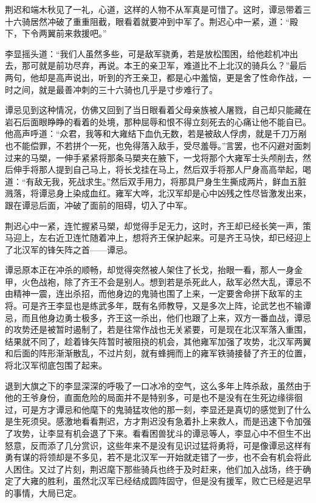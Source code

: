荆迟和端木秋见了一礼，心道，这样的人物不从军真是可惜了。这时，谭忌带着三十六骑居然冲破了重重阻截，眼看着就要冲到中军了。荆迟心中一紧，道：“殿下，下令两翼前来救援吧。”

李显摇头道：“我们人虽然多些，可是敌军骁勇，若是放松围困，给他趁机冲出去，那可就是前功尽弃，再说。本王的亲卫军，难道比不上北汉的骑兵么？”最后两句，他却是高声说出，听到的齐王亲卫，都是心中羞恼，更是舍了性命作战，一时之间，就是最善冲刺的三十六骑也几乎是寸步难行了。

谭忌见到这种情况，仿佛又回到了当日眼看着父母亲族被人屠戮，自己却只能藏在岩石后面眼睁睁的看着的处境，那种屈辱和恨不得立刻死去的心痛让他不能自已。他高声呼道：“众君，我等和大雍结下血仇无数，若是被敌人俘虏，就是千刀万剐也不能偿罪，不若拼个一死，也免得落入敌手，受尽羞辱。”言罢，也不闪避对面刺过来的马槊，一伸手紧紧将那条马槊夹在腋下，一戈将那个大雍军士头颅削去，然后伸手将那人提到自己马上，将长戈挂在马上，然后双手将那人尸身高高举起，喝道：“有敌无我，死战求生。”然后双手用力，将那具尸身生生撕成两片，鲜血五脏溅落，将谭忌身上染成血红。雍军大哗，北汉军却是心中凶残之性尽皆激发出来，跟在谭忌后面，冲破了面前的阻碍，切入了中军。

荆迟心中一紧，连忙握紧马槊，却觉得手足无力，这时，齐王却已经长笑一声，策马迎上，左右近卫连忙随着冲上，想将齐王保护起来。可是齐王马快，却已经迎上了北汉军的锋矢阵之首——谭忌。

谭忌原本正在冲杀的顺畅，却觉得突然被人架住了长戈，抬眼一看，那人一身金甲，火色战袍，除了齐王不会是别人。想到若是杀死此人，敌军必然大乱，谭忌不由精神一震，连出杀招，而他身边的鬼骑也围了上来，一定要舍命拼下敌军的主将。可是齐王李显也是练武多年，既有名师教导，又是多次上阵，论武艺也不输谭忌，而且他身边勇士极多，齐王这一杀出，他们也跟了上来，双方一番血战，谭忌的攻势还是被暂时遏制了，若是往常作战也无关紧要，可是现在北汉军落入重围，结果就不同了，趁着锋矢阵暂时被阻挠的机会，其他雍军加强了攻势，北汉军两翼和后面的阵形渐渐散乱，不过片刻，就有蜂拥而上的雍军铁骑接替了齐王的位置，将北汉军彻底包围了起来。

退到大旗之下的李显深深的呼吸了一口冰冷的空气，这么多年上阵杀敌，虽然由于他的王爷身份，直面危险的局面并不是特别多，可是也不是没有在生死边缘徘徊过，可是方才谭忌和他麾下的鬼骑猛攻他的那一刻，李显还是真切的感觉到了什么是生死须臾。感激地看看荆迟，方才荆迟没有急着扑上来救人，而是迅速下令加强了攻势，让李显有机会退了下来。看看困兽犹斗的谭忌等人，李显心中不但生不出怒意，反而添了几分赏识，这些年来不是没有见识过猛将勇将，可是像谭忌这样有勇有谋的将领却是不多见，若不是北汉军一开始就走错了一步，也不会有机会将此人困住。又过了片刻，荆迟麾下那些骑兵也终于及时赶来，他们加入战场，终于确定了大雍的胜利，虽然北汉军已经结成圆阵固守，但是没有援军，败亡已经是迟早的事情，大局已定。

